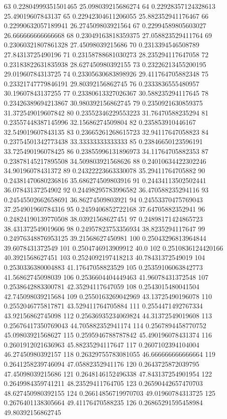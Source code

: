 {63 0.22804999351501465 25.098039215686274
64 0.22928357124328613 25.49019607843137
65 0.22942304611206055 25.882352941176467
66 0.22990632057189941 26.274509803921564
67 0.22994589805603027 26.666666666666668
68 0.23049163818359375 27.058823529411764
69 0.23060321807861328 27.45098039215686
70 0.2313394546508789 27.84313725490196
71 0.23158788681030273 28.235294117647058
72 0.23183822631835938 28.627450980392155
73 0.23226213455200195 29.01960784313725
74 0.23305630683898926 29.411764705882348
75 0.23321747779846191 29.80392156862745
76 0.2333836555480957 30.19607843137255
77 0.23380613327026367 30.588235294117645
78 0.23426389694213867 30.980392156862745
79 0.2350921630859375 31.372549019607842
80 0.23552346229553223 31.76470588235294
81 0.23557448387145996 32.15686274509804
82 0.235853910446167 32.549019607843135
83 0.23665261268615723 32.94117647058823
84 0.23754501342773438 33.33333333333333
85 0.23846650123596191 33.725490196078425
86 0.23855996131896973 34.11764705882353
87 0.23878145217895508 34.509803921568626
88 0.24010634422302246 34.90196078431372
89 0.24322223663330078 35.29411764705882
90 0.24381470680236816 35.686274509803916
91 0.24434113502502441 36.07843137254902
92 0.24498295783996582 36.470588235294116
93 0.24545502662658691 36.86274509803921
94 0.24553370475769043 37.254901960784316
95 0.2459406852722168 37.64705882352941
96 0.24824190139770508 38.03921568627451
97 0.24898171424865723 38.431372549019606
98 0.24957823753356934 38.8235294117647
99 0.24976348876953125 39.21568627450981
100 0.25043296813964844 39.6078431372549
101 0.2504746913909912 40.0
102 0.2510836124420166 40.3921568627451
103 0.2524092197418213 40.78431372549019
104 0.2530336380004883 41.17647058823529
105 0.25359106063842773 41.56862745098039
106 0.2536604404449463 41.96078431372548
107 0.2538642883300781 42.35294117647059
108 0.2543015480041504 42.745098039215684
109 0.2550163269042969 43.13725490196078
110 0.2552046775817871 43.529411764705884
111 0.2554471492767334 43.92156862745098
112 0.25636935234069824 44.31372549019608
113 0.25676417350769043 44.705882352941174
114 0.2567894458770752 45.09803921568627
115 0.2595946788787842 45.490196078431374
116 0.2601912021636963 45.88235294117647
117 0.2607102394104004 46.27450980392157
118 0.26329755783081055 46.666666666666664
119 0.2641258239746094 47.05882352941176
120 0.2643725872039795 47.45098039215686
121 0.2648146152496338 47.843137254901954
122 0.2649984359741211 48.23529411764705
123 0.26590442657470703 48.627450980392155
124 0.26614856719970703 49.01960784313725
125 0.2676401138305664 49.41176470588235
126 0.26865291595458984 49.80392156862745
}
